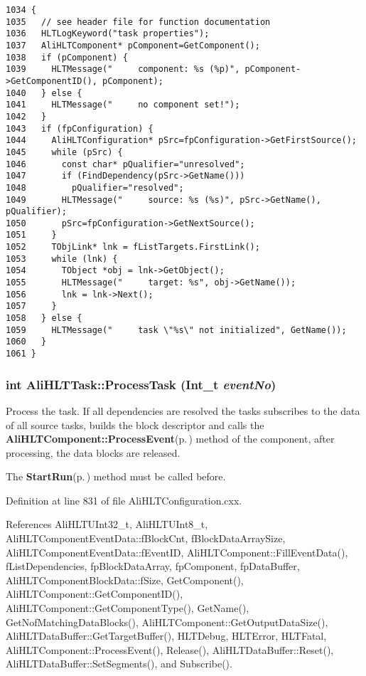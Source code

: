 \footnotesize\begin{verbatim}1034 {
1035   // see header file for function documentation
1036   HLTLogKeyword("task properties");
1037   AliHLTComponent* pComponent=GetComponent();
1038   if (pComponent) {
1039     HLTMessage("     component: %s (%p)", pComponent->GetComponentID(), pComponent);
1040   } else {
1041     HLTMessage("     no component set!");
1042   }
1043   if (fpConfiguration) {
1044     AliHLTConfiguration* pSrc=fpConfiguration->GetFirstSource();
1045     while (pSrc) {
1046       const char* pQualifier="unresolved";
1047       if (FindDependency(pSrc->GetName()))
1048         pQualifier="resolved";
1049       HLTMessage("     source: %s (%s)", pSrc->GetName(), pQualifier);
1050       pSrc=fpConfiguration->GetNextSource();
1051     }
1052     TObjLink* lnk = fListTargets.FirstLink();
1053     while (lnk) {
1054       TObject *obj = lnk->GetObject();
1055       HLTMessage("     target: %s", obj->GetName());
1056       lnk = lnk->Next();
1057     }
1058   } else {
1059     HLTMessage("     task \"%s\" not initialized", GetName());
1060   }
1061 }
\end{verbatim}\normalsize 


\subsubsection{\setlength{\rightskip}{0pt plus 5cm}int Ali\-HLTTask::Process\-Task (Int\_\-t {\em event\-No})}\label{classAliHLTTask_a20}


Process the task. If all dependencies are resolved the tasks subscribes to the data of all source tasks, builds the block descriptor and calls the {\bf Ali\-HLTComponent::Process\-Event}{\rm (p.\,\pageref{classAliHLTComponent_a6})} method of the component, after processing, the data blocks are released. \par
 The {\bf Start\-Run}{\rm (p.\,\pageref{classAliHLTTask_a18})} method must be called before. 

Definition at line 831 of file Ali\-HLTConfiguration.cxx.

References Ali\-HLTUInt32\_\-t, Ali\-HLTUInt8\_\-t, Ali\-HLTComponent\-Event\-Data::f\-Block\-Cnt, f\-Block\-Data\-Array\-Size, Ali\-HLTComponent\-Event\-Data::f\-Event\-ID, Ali\-HLTComponent::Fill\-Event\-Data(), f\-List\-Dependencies, fp\-Block\-Data\-Array, fp\-Component, fp\-Data\-Buffer, Ali\-HLTComponent\-Block\-Data::f\-Size, Get\-Component(), Ali\-HLTComponent::Get\-Component\-ID(), Ali\-HLTComponent::Get\-Component\-Type(), Get\-Name(), Get\-Nof\-Matching\-Data\-Blocks(), Ali\-HLTComponent::Get\-Output\-Data\-Size(), Ali\-HLTData\-Buffer::Get\-Target\-Buffer(), HLTDebug, HLTError, HLTFatal, Ali\-HLTComponent::Process\-Event(), Release(), Ali\-HLTData\-Buffer::Reset(), Ali\-HLTData\-Buffer::Set\-Segments(), and Subscribe().


